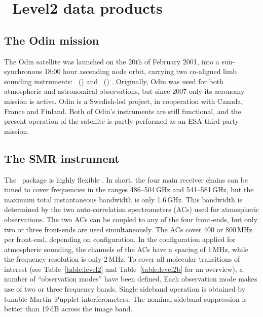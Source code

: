 \chapter{\smr\ Level2 data products}

\section{The Odin mission}
\label{sec:odin}
%

The Odin satellite was launched on the 20th of February 2001, into a sun-synchronous
18:00 hour ascending node orbit, carrying two co-aligned limb sounding
instruments: \OSIRIS\ (\OSIRISlong) and
\SMR\ (\SMRlong) \citep{murtagh:anove:02}. 
Originally, Odin was used for both
atmospheric and astronomical observations, but since 2007 only its aeronomy
mission is active. Odin is a Swedish-led project, in cooperation with Canada,
France and Finland. Both of Odin's instruments are still functional, and the
present operation of the satellite is partly performed as an ESA third party
mission.

\section{The SMR instrument}

The \smr\ package is highly flexible \citep{frisk:theod:03}. 
In short, the four main receiver chains
can be tuned to cover frequencies in the ranges 486--504\,GHz and
541--581\,GHz, but the maximum total instantaneous bandwidth is only
1.6\,GHz. This bandwidth is determined by the two auto-correlation
spectrometers (ACs) used for atmospheric observations. The two ACs can be
coupled to any of the four front-ends, but only two or three front-ends are
used simultaneously. The ACs cover 400 or 800\,MHz per front-end, depending on
configuration. In the configuration applied for atmospheric sounding, the
channels of the ACs have a spacing of 1\,MHz, while the frequency resolution is
only 2\,MHz.
To cover all molecular transitions
of interest (see Table~\ref{table:level2} and Table~\ref{table:level2b} for an overview), 
a number of ``observation modes'' have been defined. Each
observation mode makes use of two or three frequency bands. Single sideband
operation is obtained by tunable Martin--Pupplet interferometers. The nominal
sideband suppression is better than 19\,dB across the image band.

